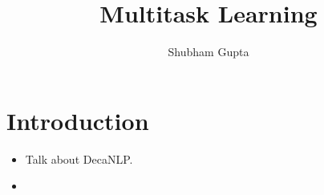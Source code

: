 \documentclass[a4paper]{article}
\title{Multitask Learning}
\author{Shubham Gupta}
\begin{document}
\maketitle
\section{Introduction}
\begin{itemize}
    \item Talk about DecaNLP.
    \item 
\end{itemize}
\end{document}
